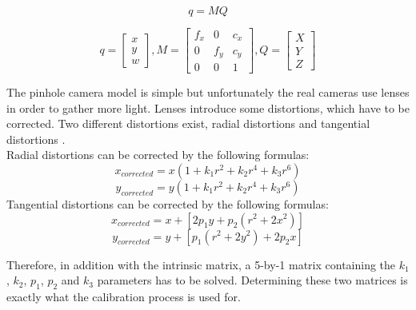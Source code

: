 \begin{equation}\label{eq:q=MQ}
  q = MQ     
\end{equation}

\begin{equation}\label{eq:q=MQMatrice}
  q = \begin{bmatrix}
       x \\
       y \\
       w 
     \end{bmatrix}, 
  M = \begin{bmatrix}
       f_x & 0 & c_x \\
       0 & f_y & c_y \\
       0 & 0 & 1
     \end{bmatrix}, 
  Q = \begin{bmatrix}
       X \\
       Y \\
       Z 
     \end{bmatrix}     
\end{equation}

The pinhole camera model is simple but unfortunately the real cameras use lenses in order to gather more light. Lenses introduce some distortions, which have to be corrected. Two different distortions exist, radial distortions and tangential distortions \cite[p. 375]{bradski_learning_2008}. \\

Radial distortions can be corrected by the following formulas:
\begin{equation}
  x_{corrected} = x(1 + k_1r^2 + k_2r^4 + k_3r^6)    
\end{equation}
\begin{equation}
  y_{corrected} = y(1 + k_1r^2 + k_2r^4 + k_3r^6)    
\end{equation}
Tangential distortions can be corrected by the following formulas: 
\begin{equation}
  x_{corrected} = x + [2p_1y + p_2(r^2 + 2x^2)]    
\end{equation}
\begin{equation}
  y_{corrected} = y + [p_1(r^2 + 2y^2) + 2p_2x]
\end{equation}

Therefore, in addition with the intrinsic matrix, a 5-by-1 matrix containing the $k_1$, $k_2$, $p_1$, $p_2$ and $k_3$ parameters has to be solved. Determining these two matrices is exactly what the calibration process is used for. \\


